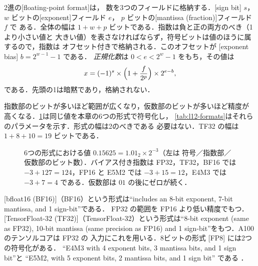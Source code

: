 \documentclass[../main.tex]{subfiles}
\begin{document}
\begin{definition}[浮動小数点形式]
  2進の[floating-point format]は，
  数を3つのフィールドに格納する．[sign bit] $s$，
  $w$ ビットの[exponent]フィールド $e$，
  $p$ ビットの[mantissa (fraction)]フィールド $f$ で
  ある．全体の幅は
  $1 + w + p$ ビットである．指数は負と正の両方のべき（1より小さい値と
  大きい値）を表さなければならず，符号ビットは値のほうに属するので，指数は
  オフセット付きで格納される．このオフセットが
  [exponent bias] $b = 2^{w-1} - 1$ である．
  \emph{正規化数}は $0 < e < 2^w - 1$ をもち，その値は
  \begin{equation}
    x = (-1)^{s} \times \Bigl(1 + \frac{f}{2^{p}}\Bigr) \times 2^{e - b} ,
    \label{eq:l12-normal}
  \end{equation}
  である．先頭の1は暗黙であり，格納されない．
\end{definition}

指数部のビットが多いほど範囲が広くなり，仮数部のビットが多いほど精度が
高くなる．\cref{fig:l12-formats}は同じ値を本章の6つの形式で符号化し，
\cref{tab:l12-formats}はそれらのパラメータを示す．形式の幅は2のべきである
必要はない．TF32 の幅は $1 + 8 + 10 = 19$ ビットである．

\begin{figure}[tb]
  \centering
  
  \caption{6つの形式における値 $0.15625 = 1.01_2 \times 2^{-3}$（左は
    符号／指数部／仮数部のビット数）．バイアス付き指数は FP32，TF32，BF16
    では $-3 + 127 = 124$，FP16 と E5M2 では $-3 + 15 = 12$，E4M3 では
    $-3 + 7 = 4$ である．仮数部は $01$ の後にゼロが続く．}
  \label{fig:l12-formats}
\end{figure}

\begin{definition}[ML 向けの形式]
  [bfloat16 (BF16)]（BF16）という形式は\enquote{includes an 8-bit
  exponent, 7-bit mantissa, and 1 sign-bit}\cite{nvidia2020ampere}である．
  FP32 の範囲を FP16 より低い精度でもつ．
  [TensorFloat-32 (TF32)]（TensorFloat-32）という形式は\enquote{8-bit
  exponent (same as FP32), 10-bit mantissa (same precision as FP16) and 1
  sign-bit}\cite{nvidia2020ampere}をもつ．A100 のテンソルコアは FP32 の
  入力にこれを用いる．8ビットの形式 [FP8] には2つの符号化がある．
  \enquote{E4M3 with 4 exponent bits, 3 mantissa bits, and 1 sign bit}と
  \enquote{E5M2, with 5 exponent bits, 2 mantissa bits, and 1 sign bit}
  である \cite{nvidia2022hopper}．
\end{definition}
\end{document}
